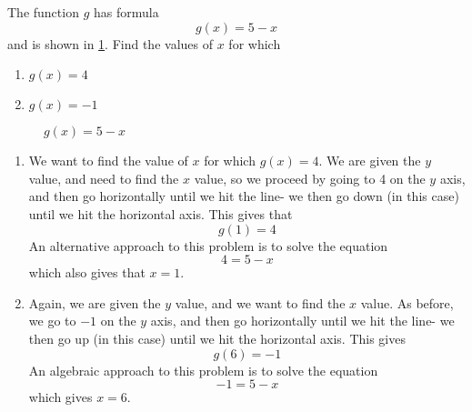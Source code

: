 \begin{myexample}\label{ex:quadraticeval}
The function $g$ has formula
\[
	g(x) = 5-x
\]
and is shown in \cref{fig:linfunctionevalfindx}. Find the values of $x$ for which
\begin{multicols}{2}
	\begin{enumerate}
		\item $g(x)=4$
		\item $g(x)=-1$
	\end{enumerate} 
\end{multicols}
{}
\end{myexample}
\begin{figure}[!h]
	\centering
	\caption{$g(x)=5-x$}
	\label{fig:linfunctionevalfindx}
\end{figure}
\begin{myProof}
	\begin{enumerate}
		\item We want to find the value of $x$ for which $g(x)=4$. We are given the $y$ value, and need to find the $x$ value, so we 
		proceed by going to 4 on the $y$ axis, and then go horizontally until we hit the line- we then go down (in this case) until
		we hit the horizontal axis. This gives that
		\[
			g(1)=4
		\]
		An alternative approach to this problem is to solve the equation
		\[
			4 = 5-x
		\]  
		which also gives that $x=1$.
		\item Again, we are given the $y$ value, and we want to find the $x$ value. As before, we go to $-1$ on the $y$ axis, and then
		go horizontally until we hit the line- we then go up (in this case) until we hit the horizontal axis. This gives
		\[
			g(6)=-1
		\]
		An algebraic approach to this problem is to solve the equation
		\[
			-1 = 5 - x
		\]
		which gives $x=6$.
	\end{enumerate} 
	{}
\end{myProof} 

